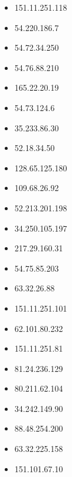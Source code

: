 \documentclass{article}
\begin{document}
\begin{itemize}
        \item 151.11.251.118
    
        \item 54.220.186.7
    
        \item 54.72.34.250
    
        \item 54.76.88.210
    
        \item 165.22.20.19
    
        \item 54.73.124.6
    
        \item 35.233.86.30
    
        \item 52.18.34.50
    
        \item 128.65.125.180
    
        \item 109.68.26.92
    
        \item 52.213.201.198
    
        \item 34.250.105.197
    
        \item 217.29.160.31
    
        \item 54.75.85.203
    
        \item 63.32.26.88
    
        \item 151.11.251.101
    
        \item 62.101.80.232
    
        \item 151.11.251.81
    
        \item 81.24.236.129
    
        \item 80.211.62.104
    
        \item 34.242.149.90
    
        \item 88.48.254.200
    
        \item 63.32.225.158
    
        \item 151.101.67.10
    

\end{itemize}
\end{document}
